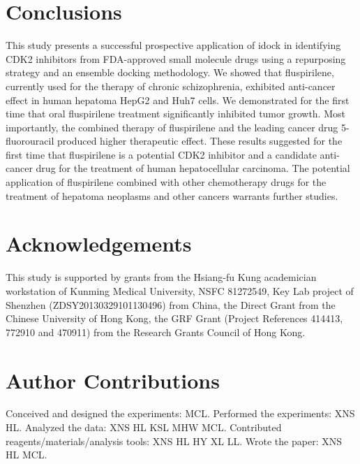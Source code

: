 \documentclass[10pt]{article}
\begin{document}
\section*{Conclusions}

This study presents a successful prospective application of idock \cite{1153,1362} in identifying CDK2 inhibitors from FDA-approved small molecule drugs using a repurposing strategy and an ensemble docking methodology. We showed that fluspirilene, currently used for the therapy of chronic schizophrenia, exhibited anti-cancer effect in human hepatoma HepG2 and Huh7 cells. We demonstrated for the first time that oral fluspirilene treatment significantly inhibited tumor growth. Most importantly, the combined therapy of fluspirilene and the leading cancer drug 5-fluorouracil produced higher therapeutic effect. These results suggested for the first time that fluspirilene is a potential CDK2 inhibitor and a candidate anti-cancer drug for the treatment of human hepatocellular carcinoma. The potential application of fluspirilene combined with other chemotherapy drugs for the treatment of hepatoma neoplasms and other cancers warrants further studies.

\section*{Acknowledgements}

This study is supported by grants from the Hsiang-fu Kung academician workstation of Kunming Medical University, NSFC 81272549, Key Lab project of Shenzhen (ZDSY20130329101130496) from China, the Direct Grant from the Chinese University of Hong Kong, the GRF Grant (Project References 414413, 772910 and 470911) from the Research Grants Council of Hong Kong.

\section*{Author Contributions}

Conceived and designed the experiments: MCL. Performed the experiments: XNS HL. Analyzed the data: XNS HL KSL MHW MCL. Contributed reagents/materials/analysis tools: XNS HL HY XL LL. Wrote the paper: XNS HL MCL.


\end{document}
